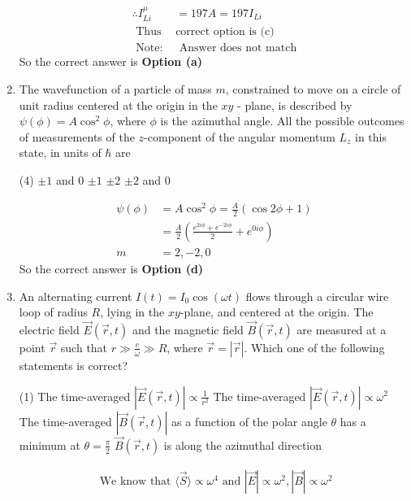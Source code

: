 \begin{enumerate}
\begin{answer}
\begin{align*}
	\therefore I_{L i}^{\mu}&=197 A=197 I_{L i}\\
	\text { Thus  }&\text{correct option is (c) }\\
	\text { Note: }&\text{ Answer  does not match}
	\end{align*}
		So the correct answer is \textbf{Option (a)}
\end{answer}
\item The wavefunction of a particle of mass $m$, constrained to move on a circle of unit radius centered at the origin in the $x y$ - plane, is described by $\psi(\phi)=A \cos ^{2} \phi$, where $\phi$ is the azimuthal angle. All the possible outcomes of measurements of the $z$-component of the angular momentum $L_{z}$ in this state, in units of $\hbar$ are
 \begin{tasks}(4)
	\task[\textbf{a.}]$\pm 1$ and 0
	\task[\textbf{b.}]$\pm 1$
	\task[\textbf{c.}]$\pm 2$
	\task[\textbf{d.}]  $\pm 2$ and 0
\end{tasks}
\begin{answer}
	\begin{align*}
	\psi(\phi)&=A \cos ^{2} \phi=\frac{A}{2}(\cos 2 \phi+1)\\
	&=\frac{A}{2}\left(\frac{e^{2 i \phi}+e^{-2 i \phi}}{2}+e^{0 i \phi}\right) \\
	m&=2,-2,0
	\end{align*}
		So the correct answer is \textbf{Option (d)}
\end{answer}
\item An alternating current $I(t)=I_{0} \cos (\omega t)$ flows through a circular wire loop of radius $R$, lying in the $x y$-plane, and centered at the origin. The electric field $\vec{E}(\vec{r}, t)$ and the magnetic field $\vec{B}(\vec{r}, t)$ are measured at a point $\vec{r}$ such that $r \gg \frac{c}{\omega} \gg R$, where $\vec{r}=|\vec{r}|$.
Which one of the following statements is correct?
 \begin{tasks}(1)
	\task[\textbf{a.}] The time-averaged $|\vec{E}(\vec{r}, t)| \propto \frac{1}{r^{2}}$
	\task[\textbf{b.}] The time-averaged $|\vec{E}(\vec{r}, t)| \propto \omega^{2}$
	\task[\textbf{c.}] The time-averaged $|\vec{B}(\vec{r}, t)|$ as a function of the polar angle $\theta$ has a minimum at $\theta=\frac{\pi}{2}$
	\task[\textbf{d.}]$\vec{B}(\vec{r}, t)$ is along the azimuthal direction 
\end{tasks}
\begin{answer}
	\begin{align*}
	\text { We know that }\langle\vec{S}\rangle \propto \omega^{4} \text { and }|\vec{E}| \propto \omega^{2},|\vec{B}| \propto \omega^{2}

\end{align*}
\end{answer}
\end{enumerate}
